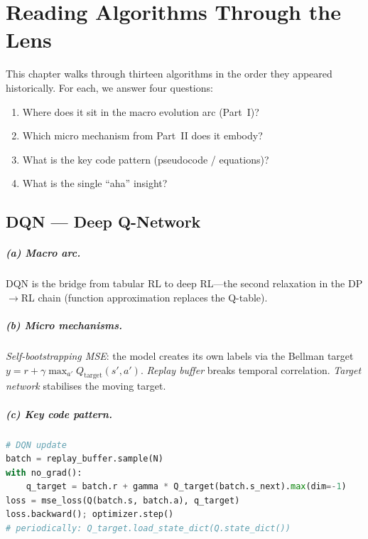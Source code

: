 \chapter{Reading Algorithms Through the Lens}
\label{ch:code-reading}

This chapter walks through thirteen algorithms in the order they appeared historically.
For each, we answer four questions:
\begin{enumerate}[label=(\alph*)]
  \item Where does it sit in the macro evolution arc (Part~I)?
  \item Which micro mechanism from Part~II does it embody?
  \item What is the key code pattern (pseudocode / equations)?
  \item What is the single ``aha'' insight?
\end{enumerate}

\section{DQN --- Deep Q-Network}
\label{sec:dqn}

\paragraph{(a) Macro arc.}
DQN is the bridge from tabular RL to deep RL---the second relaxation in the DP$\to$RL chain (function approximation replaces the Q-table).

\paragraph{(b) Micro mechanisms.}
\emph{Self-bootstrapping MSE}: the model creates its own labels via the Bellman target $y = r + \gamma\max_{a'}Q_{\text{target}}(s',a')$.
\emph{Replay buffer} breaks temporal correlation.
\emph{Target network} stabilises the moving target.

\paragraph{(c) Key code pattern.}

\begin{lstlisting}[language=Python]
# DQN update
batch = replay_buffer.sample(N)
with no_grad():
    q_target = batch.r + gamma * Q_target(batch.s_next).max(dim=-1)
loss = mse_loss(Q(batch.s, batch.a), q_target)
loss.backward(); optimizer.step()
# periodically: Q_target.load_state_dict(Q.state_dict())
\end{lstlisting}

